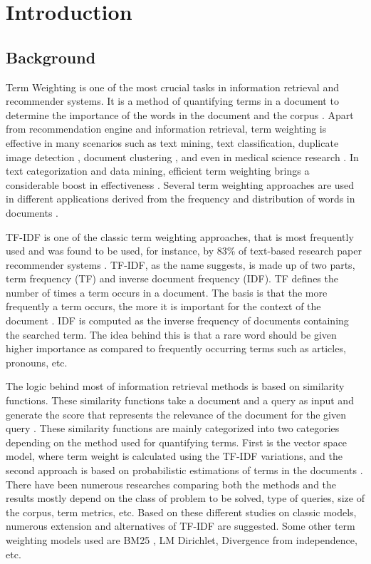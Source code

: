 \chapter{Introduction}

	\section{Background}
	Term Weighting is one of the most crucial tasks in information retrieval and recommender systems. It is a method of quantifying terms in a document to determine the importance of the words in the document and the corpus \cite{RN13}. 
	Apart from recommendation engine and information retrieval, term weighting is effective in many scenarios such as text mining, text classification, duplicate image detection \cite{RN22}, document clustering \cite{RN21}, and even in medical science research \cite{matsuo2018semantic}. In text categorization and data mining, efficient term weighting brings a considerable boost in effectiveness \cite{RN24}. Several term weighting approaches are used in different applications derived from the frequency and distribution of words in documents \cite{RN24}. 
	
	TF-IDF is one of the classic term weighting approaches, that is most frequently used and was found to be used, for instance, by 83\% of text-based research paper recommender systems \cite{RN23}. TF-IDF, as the name suggests, is made up of two parts, term frequency (TF) and inverse document frequency (IDF). TF defines the number of times a term occurs in a document. The basis is that the more frequently a term occurs, the more it is important for the context of the document \cite{RN23}.  IDF is computed as the inverse frequency of documents containing the searched term. The idea behind this is that a rare word should be given higher importance as compared to frequently occurring terms such as articles, pronouns, etc. 
	
	The logic behind most of information retrieval methods is based on similarity functions. These similarity functions take a document and a query as input and generate the score that represents the relevance of the document for the given query \cite{RN26}. These similarity functions are mainly categorized into two categories depending on the method used for quantifying terms. First is the vector space model, where term weight is calculated using the TF-IDF variations, and the second approach is based on probabilistic estimations of terms in the documents \cite{RN14}. There have been numerous researches comparing both the methods and the results mostly depend on the class of problem to be solved, type of queries, size of the corpus, term metrics, etc. Based on these different studies on classic models, numerous extension and alternatives of TF-IDF are suggested. Some other term weighting models used are BM25 \cite{robertson2009probabilistic}, LM Dirichlet, Divergence from independence, etc. 
	
